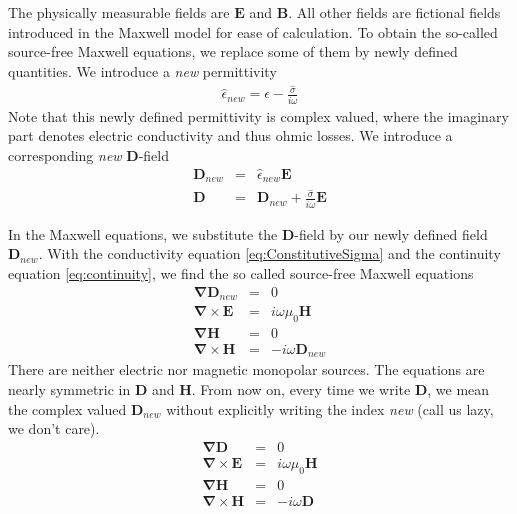 \documentclass[12pt,a4paper,twoside,openright,BCOR10mm,headsepline,titlepage,abstracton,chapterprefix,final]{scrreprt}
\newcommand\Vector[1]{{\mathbf{#1}}}
\newcommand\vacuum{0}
\newcommand\Nabla{\Vector{\nabla}}
\newcommand\Tensor[1]{\hat{#1}}
\newcommand\scalarEfield{E}
\newcommand\scalarBfield{B}
\newcommand\scalarHfield{H}
\newcommand\scalarDfield{D}
\newcommand\Efield{\Vector{\scalarEfield}}
\newcommand\Bfield{\Vector{\scalarBfield}}
\newcommand\Hfield{\Vector{\scalarHfield}}
\newcommand\Dfield{\Vector{\scalarDfield}}
\newcommand\vacuumpermeability{\mu_{\vacuum}}
\newcommand\permittivity{\Tensor{\epsilon}}
\newcommand\conductivity{\Tensor{\sigma}}
\begin{document}
The physically measurable fields are $\Efield$ and $\Bfield$. All other fields are fictional fields introduced in the Maxwell model for ease of calculation.
To obtain the so-called source-free Maxwell equations, we replace some of them by newly defined quantities.
We introduce a \emph{new} permittivity
\begin{eqnarray}
  \permittivity_{new} = \permittivity - \frac{\conductivity}{i \omega}
\end{eqnarray}
Note that this newly defined permittivity is complex valued, where the imaginary part denotes electric conductivity and thus ohmic losses.
We introduce a corresponding \emph{new} $\Dfield$-field
\begin{eqnarray}
  \Dfield_{new} &=& \permittivity_{new} \Efield \\
  \Dfield &=& \Dfield_{new} + \frac{\conductivity}{i \omega} \Efield
\end{eqnarray}

In the Maxwell equations, we substitute the $\Dfield$-field by our newly defined field $\Dfield_{new}$.
With the conductivity equation \ref{eq:ConstitutiveSigma} and the continuity equation \ref{eq:continuity}, we find the so called source-free Maxwell equations
\begin{subequations}
\begin{eqnarray}
  \Nabla \Dfield_{new} &=& 0 					\label{eq:divDsourcefree}\\
  \Nabla \times \Efield &=& i \omega \vacuumpermeability \Hfield	\\
  \Nabla \Hfield &=& 0  					\\
  \Nabla \times \Hfield &=& - i \omega \Dfield_{new}  		
\end{eqnarray}
\end{subequations}
There are neither electric nor magnetic monopolar sources.
The equations are nearly symmetric in $\Dfield$ and $\Hfield$.
From now on, every time we write $\Dfield$, we mean the complex valued $\Dfield_{new}$ without explicitly writing the index \emph{new} (call us lazy, we don't care).
\begin{subequations}
\begin{eqnarray}
  \Nabla \Dfield &=& 0 					\\
  \Nabla \times \Efield &=& i \omega \vacuumpermeability \Hfield	\\
  \Nabla \Hfield &=& 0  					\\
  \Nabla \times \Hfield &=& - i \omega \Dfield  		
\end{eqnarray}
\label{eq:sourcefreemaxwell}
\end{subequations}
\end{document}
